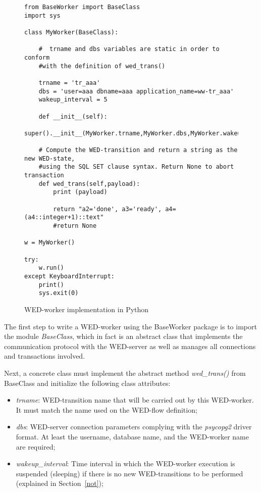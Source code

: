 \documentclass[12pt]{article}
\begin{document}
\begin{figure}[!t]
\begin{Verbatim}[fontsize=\tiny]
from BaseWorker import BaseClass
import sys

class MyWorker(BaseClass):
    
    #  trname and dbs variables are static in order to conform 
    #with the definition of wed_trans()
        
    trname = 'tr_aaa'
    dbs = 'user=aaa dbname=aaa application_name=ww-tr_aaa'
    wakeup_interval = 5
    
    def __init__(self):
        super().__init__(MyWorker.trname,MyWorker.dbs,MyWorker.wakeup_interval)
    
    # Compute the WED-transition and return a string as the new WED-state, 
    #using the SQL SET clause syntax. Return None to abort transaction
    def wed_trans(self,payload):
        print (payload)
        
        return "a2='done', a3='ready', a4=(a4::integer+1)::text"
        #return None
        
w = MyWorker()

try:
    w.run()
except KeyboardInterrupt:
    print()
    sys.exit(0)
\end{Verbatim}
\caption{WED-worker implementation in Python}
\label{fig_ww}
\end{figure}
The first step to write a WED-worker using the BaseWorker package is to import the module \emph{BaseClass}, which in fact is an abstract class that implements the communication protocol with the WED-server as well as manages all connections and transactions involved.  

\par  Next, a concrete class must implement the abstract method \emph{wed\_trans()} from BaseClass and initialize the following class attributes: 
\begin{itemize}
\item \emph{trname}: WED-transition name that will be carried out by this WED-worker. It must match the name used on the WED-flow definition;
\item \emph{dbs}: WED-server connection parameters complying with the \emph{psycopg2} driver format. At least the username, database name, and the WED-worker name are required;
\item \emph{wakeup\_interval}: Time interval in which the WED-worker execution is suspended (sleeping) if there is no new WED-transitions to be performed (explained in Section~\ref{not}); 
\end{itemize}
\end{document}
